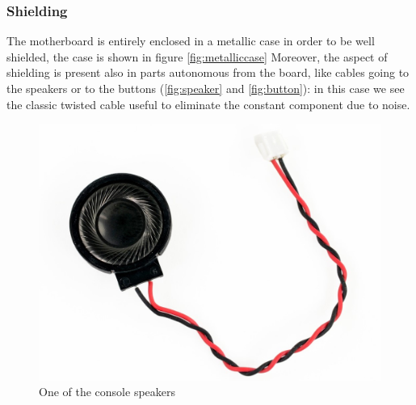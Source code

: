 \documentclass[11pt,a4paper,titlepage]{article}
\begin{document}
      \subsubsection{Shielding}
        The motherboard is entirely enclosed in a metallic case in order to be well shielded, the case is shown in figure \autoref{fig:metalliccase} Moreover, the aspect of shielding is present also in parts autonomous from the board, like cables going to the speakers or to the buttons (\autoref{fig:speaker} and \autoref{fig:button}): in this case we see the classic twisted cable useful to eliminate the constant component due to noise.

        \begin{figure}[h]
          \begin{minipage}{.5 \textwidth}
            \centering
            \includegraphics[width = \textwidth]{speaker.png}
            \caption{One of the console speakers}
            \label{fig:speaker}
          \end{minipage}
          \vspace{5mm}
          \begin{minipage}{.5 \textwidth}
            \centering

\end{minipage}
\end{figure}
\end{document}
